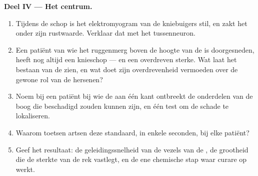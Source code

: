 \begin{problem}
\medskip
\noindent\textbf{Deel IV --- Het centrum.}
\begin{enumerate}[resume]
  \item Tijdens de schop is het elektromyogram van de kniebuigers stil, en
        zakt het onder zijn rustwaarde. Verklaar dat met het tussenneuron.
  \item Een patiënt van wie het ruggenmerg boven de hoogte van de  is
        doorgesneden, heeft nog altijd een knieschop --- en een overdreven
        sterke. Wat laat het bestaan van de  zien, en wat doet zijn
        overdrevenheid vermoeden over de gewone rol van de hersenen?
  \item Noem bij een patiënt bij wie de  aan één kant ontbreekt de
        onderdelen van de boog die beschadigd zouden kunnen zijn, en één
        test om de schade te lokaliseren.
  \item Waarom toetsen artsen deze  standaard, in enkele seconden,
        bij elke patiënt?
  \item Geef het resultaat: de geleidingssnelheid van de vezels van de
        , de grootheid die de sterkte van de rek vastlegt, en de ene
        chemische stap waar curare op werkt.
\end{enumerate}
\end{problem}

